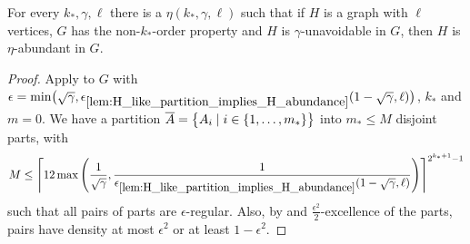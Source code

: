         \begin{theorem} \label{thm:property_testing_with_stable_partitions}
            For every $k_*, \gamma, \ell$ there is a $\eta(k_*, \gamma, \ell)$ such that if $H$ is a graph with $\ell$
            vertices, $G$ has the non-$k_*$-order property and $H$ is $\gamma$-unavoidable in $G$, then $H$ is
            $\eta$-abundant in $G$.
            \begin{proof}
                Apply  to $G$ with $\epsilon = \min \bigl( \sqrt{\gamma},
                    \epsilon_{\ref{lem:H_like_partition_implies_H_abundance}} ( 1 - \sqrt{\gamma}, \ell ) \bigr)$,
                $k_*$ and $m=0$.
                We have a partition $\overline{A} = \bigl\{ A_i \mid i \in \{ 1, \dots, m_* \} \bigr\}$ into $m_* \leq M$
                disjoint parts, with
                \[
                    M \leq \left\lceil 12 \max\left( \frac{1}{\sqrt{\gamma}}, \frac{1}{\epsilon_{\ref{lem:H_like_partition_implies_H_abundance}}
                        ( 1 - \sqrt{\gamma}, \ell )} \right) \right\rceil^{2^{k_*+1}-1}
                \]
                such that all pairs of parts are $\epsilon$-regular.
                Also, by  and $\frac{\epsilon^2}{2}$-excellence of the parts,
                pairs have density at most $\epsilon^2$ or at least $1 - \epsilon^2$.


\end{proof}
\end{theorem}
